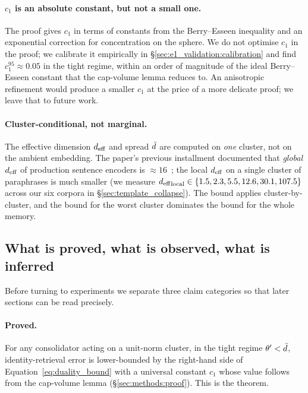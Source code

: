 \paragraph{$c_1$ is an absolute constant, but not a small one.} The proof
gives $c_1$ in terms of constants from the Berry--Esseen inequality and
an exponential correction for concentration on the sphere. We do not
optimise $c_1$ in the proof; we calibrate it empirically in
\S\ref{sec:e1_validation:calibration} and find $c_1^{95} \approx 0.05$ in
the tight regime, within an order of magnitude of the ideal Berry--Esseen
constant that the cap-volume lemma reduces to. An anisotropic refinement would produce a smaller $c_1$ at
the price of a more delicate proof; we leave that to future work.

\paragraph{Cluster-conditional, not marginal.} The effective dimension
${d_{\mathrm{eff}}}$ and spread $\bar{d}$ are computed on \emph{one} cluster, not on
the ambient embedding. The paper's previous installment documented that
\emph{global} ${d_{\mathrm{eff}}}$ of production sentence encoders is $\approx
16$~\cite{geometryOfForgetting2026}; the local ${d_{\mathrm{eff}}}$ on a single
cluster of paraphrases is much smaller (we measure ${d_{\mathrm{eff}}}_{\mathrm{local}}
\in \{1.5, 2.3, 5.5, 12.6, 30.1, 107.5\}$ across our six corpora in
\S\ref{sec:template_collapse}). The bound applies cluster-by-cluster, and
the bound for the worst cluster dominates the bound for the whole
memory.

\subsection{What is proved, what is observed, what is inferred}
\label{sec:duality:proved_observed_inferred}

Before turning to experiments we separate three claim categories so
that later sections can be read precisely.

\paragraph{Proved.} For any consolidator acting on a unit-norm cluster,
in the tight regime $\theta' < \bar{d}$,
identity-retrieval error is lower-bounded by the right-hand side of
Equation~\eqref{eq:duality_bound} with a universal constant $c_1$ whose
value follows from the cap-volume lemma
(\S\ref{sec:methods:proof}). This is the theorem.

